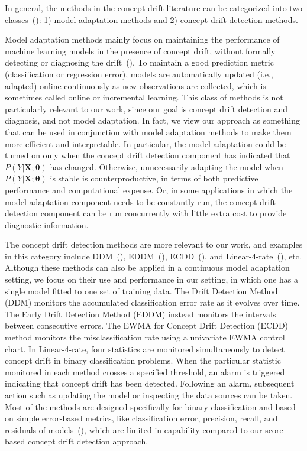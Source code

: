 \documentclass[twoside,11pt]{article}
\begin{document}
In general, the methods in the concept drift literature can be categorized into two classes~(\cite{tsymbal2004problem}): 1) model adaptation methods and 2) concept drift detection methods.

Model adaptation methods mainly focus on maintaining the performance of machine learning models in the presence of concept drift, without formally detecting or diagnosing the drift~(\cite{wang2003mining,tsymbal2008dynamic,gonccalves2014comparative,barros2018large}). To maintain a good prediction metric (classification or regression error), models are automatically updated (i.e., adapted) online continuously as new observations are collected, which is sometimes called online or incremental learning. This class of methods is not particularly relevant to our work, since our goal is concept drift detection and diagnosis, and not model adaptation. In fact, we view our approach as something that can be used in conjunction with model adaptation methods to make them more efficient and interpretable. In particular, the model adaptation could be turned on only when the concept drift detection component has indicated that $P(Y|\bm{X};\bm{\theta})$ has changed. Otherwise, unnecessarily adapting the model when $P(Y|\bm{X}; \bm{\theta})$ is stable is counterproductive, in terms of both predictive performance and computational expense. Or, in some applications in which the model adaptation component needs to be constantly run, the concept drift detection component can be run concurrently with little extra cost to provide diagnostic information.

The concept drift detection methods are more relevant to our work, and examples in this category include DDM~(\cite{gama2004learning}), EDDM~(\cite{baena2006early}), ECDD~(\cite{ross2012exponentially}), and Linear-4-rate~(\cite{wang2015concept}), etc. Although these methods can also be applied in a continuous model adaptation setting, we focus on their use and performance in our setting, in which one has a single model fitted to one set of training data. The Drift Detection Method (DDM) monitors the accumulated classification error rate as it evolves over time. The Early Drift Detection Method (EDDM) instead monitors the intervals between consecutive errors. The EWMA for Concept Drift Detection (ECDD) method monitors the misclassification rate using a univariate EWMA control chart. In Linear-4-rate, four statistics are monitored simultaneously to detect concept drift in binary classification problems. When the particular statistic monitored in each method crosses a specified threshold, an alarm is triggered indicating that concept drift has been detected. Following an alarm, subsequent action such as updating the model or inspecting the data sources can be taken. Most of the methods are designed specifically for binary classification and based on simple error-based metrics, like classification error, precision, recall, and residuals of models~(\cite{wang2015concept,barros2018large}), which are limited in capability compared to our score-based concept drift detection approach.
\end{document}
